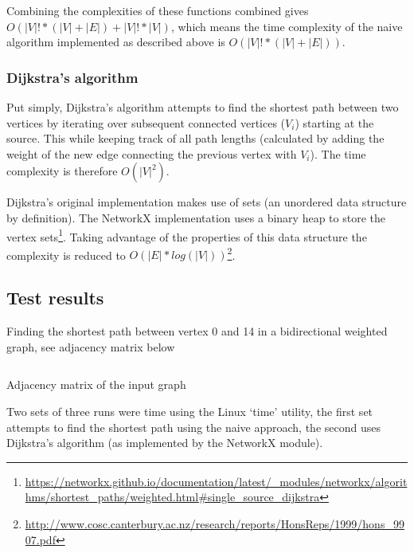 \documentclass[a4paper,12px]{article}
\begin{document}
Combining the complexities of these functions combined gives
$O(|V|! * (|V|+|E|) + |V|! * |V|)$, which means the time
complexity of the naive algorithm implemented as described above
is $O(|V|! * (|V|+|E|))$.


\subsubsection{Dijkstra's algorithm}

Put simply, Dijkstra's algorithm attempts to find the shortest path between two
vertices by iterating over subsequent connected vertices ($V_{i}$) starting at the
source. This while keeping track of all path lengths (calculated by adding the
weight of the new edge connecting the previous vertex with $V_{i}$). The time
complexity is therefore $O(|V|^{2})$.

Dijkstra's original implementation makes use of sets (an unordered data
structure by definition). The NetworkX implementation uses a binary heap to
store the vertex
sets\footnote{\url{https://networkx.github.io/documentation/latest/\_modules/networkx/algorithms/shortest\_paths/weighted.html\#single\_source\_dijkstra}}.
Taking advantage of the properties of this data structure the complexity is
reduced to $O(|E| *
log(|V|))$\footnote{\url{http://www.cosc.canterbury.ac.nz/research/reports/HonsReps/1999/hons\_9907.pdf}}.

\newpage

\subsection{Test results}

Finding the shortest path between vertex 0 and 14 in a bidirectional weighted graph, see adjacency matrix below
\begin{listing}[H]
    \inputminted[fontsize=\footnotesize]{text}{inputgraph}
    \caption{Adjacency matrix of the input graph}
\end{listing}

Two sets of three runs were time using the Linux `time' utility, the first set
attempts to find the shortest path using the naive approach, the second uses
Dijkstra's algorithm (as implemented by the NetworkX module).
\end{document}
